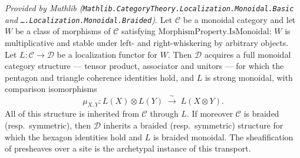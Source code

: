 \begin{lemma}
  \label{lem:monoidalLocalization_mathlib}
  \mathlibok
  \textit{Provided by Mathlib
  (\texttt{Mathlib.CategoryTheory.Localization.Monoidal.Basic} and
  \texttt{\ldots.Localization.Monoidal.Braided}).}
  Let \(\mathcal{C}\) be a monoidal category and let \(W\) be a class of morphisms
  of \(\mathcal{C}\) satisfying \(\mathrm{MorphismProperty.IsMonoidal}\): \(W\) is
  multiplicative and stable under left- and right-whiskering by arbitrary objects.
  Let \(L : \mathcal{C} \to \mathcal{D}\) be a
  localization functor for \(W\). Then \(\mathcal{D}\) acquires a full monoidal
  category structure --- tensor product, associator and unitors --- for which the
  pentagon and triangle coherence identities hold, and \(L\) is strong monoidal,
  with comparison isomorphisms
  \[
    \mu_{X,Y} : L(X) \otimes L(Y) \;\xrightarrow{\ \sim\ }\; L(X \otimes Y).
  \]
  All of this structure is inherited from \(\mathcal{C}\) through \(L\). If moreover
  \(\mathcal{C}\) is braided (resp.\ symmetric), then \(\mathcal{D}\) inherits a
  braided (resp.\ symmetric) structure for which the hexagon identities hold and
  \(L\) is braided monoidal. The sheafification of presheaves over a site is the
  archetypal instance of this transport.
\end{lemma}


